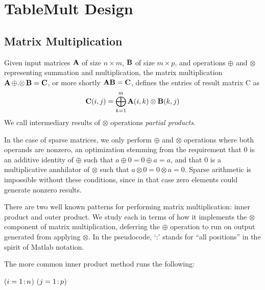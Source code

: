 
\section{TableMult Design}
\label{sDesign}


\subsection{Matrix Multiplication}
\label{sMatMul}
Given input matrices $\mathbf{A}$ of size $n \times m$, $\mathbf{B}$ of size $m \times p$,
and operations $\oplus$ and $\otimes$ representing summation and multiplication,
the matrix multiplication $\mathbf{A} \,{\oplus}.{\otimes}\, \mathbf{B} = \mathbf{C}$, or more shortly $\mathbf{A}\mathbf{B} = \mathbf{C}$,
defines the entries of result matrix C as 
\[ \mathbf{C}(i,j) = \bigoplus_{k=1}^m \mathbf{A}(i,k) \otimes \mathbf{B}(k,j) \]
We call intermediary results of $\otimes$ operations \emph{partial products}.

In the case of sparse matrices, we only perform $\oplus$ and $\otimes$ operations where both operands are nonzero,
an optimization stemming from the requirement that 0 is an additive identity of $\oplus$ such that $a \oplus 0 = 0 \oplus a = a$,
and that 0 is a multiplicative annhilator of $\otimes$ such that $a \otimes 0 = 0 \otimes a = 0$.
Sparse arithmetic is impossible without these conditions, since in that case zero elements could generate nonzero results.




There are two well known patterns for performing matrix multiplication: inner product and outer product.
We study each in terms of how it implements the $\otimes$ component of matrix multiplication,
deferring the $\oplus$ operation to run on output generated from applying $\otimes$.
In the pseudocode, `:' stands for ``all positions'' in the spirit of Matlab notation.


The more common inner product method runs the following:
\begin{algorithm}[h]
\fore($i = 1\colon\! n$){
\fore($j = 1\colon\! p$){
}}
\end{algorithm}

